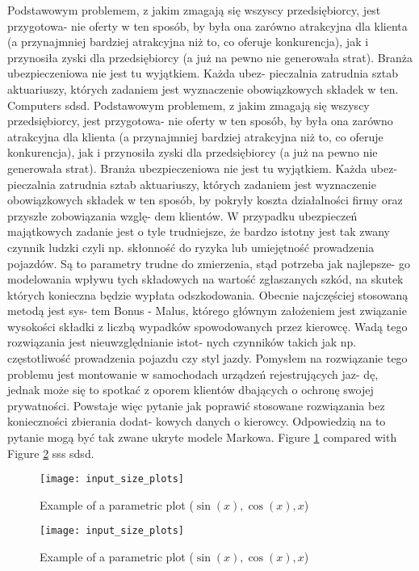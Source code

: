 \documentclass[a4paper, 11pt, onecolumn, openany, titlepage]{report}
\begin{document}
Podstawowym problemem, z jakim zmagają się wszyscy przedsiębiorcy, jest przygotowa- nie oferty w ten sposób, by była ona zarówno atrakcyjna dla klienta (a przynajmniej bardziej atrakcyjna niż to, co oferuje konkurencja), jak i przynosiła zyski dla przedsiębiorcy (a już na pewno nie generowała strat). Branża ubezpieczeniowa nie jest tu wyjątkiem. Każda ubez- pieczalnia zatrudnia sztab aktuariuszy, których zadaniem jest wyznaczenie obowiązkowych składek w ten.
Computers \cite{einstein} sdsd.
Podstawowym problemem, z jakim zmagają się wszyscy przedsiębiorcy, jest przygotowa- nie oferty w ten sposób, by była ona zarówno atrakcyjna dla klienta (a przynajmniej bardziej atrakcyjna niż to, co oferuje konkurencja), jak i przynosiła zyski dla przedsiębiorcy (a już na pewno nie generowała strat). Branża ubezpieczeniowa nie jest tu wyjątkiem. Każda ubez- pieczalnia zatrudnia sztab aktuariuszy, których zadaniem jest wyznaczenie obowiązkowych składek w ten sposób, by pokryły koszta działalności firmy oraz przyszłe zobowiązania wzglę- dem klientów. W przypadku ubezpieczeń majątkowych zadanie jest o tyle trudniejsze, że bardzo istotny jest tak zwany czynnik ludzki czyli np. skłonność do ryzyka lub umiejętność prowadzenia pojazdów. Są to parametry trudne do zmierzenia, stąd potrzeba jak najlepsze- go modelowania wpływu tych składowych na wartość zgłaszanych szkód, na skutek których konieczna będzie wypłata odszkodowania. Obecnie najczęściej stosowaną metodą jest sys- tem Bonus - Malus, którego głównym założeniem jest związanie wysokości składki z liczbą wypadków spowodowanych przez kierowcę. Wadą tego rozwiązania jest nieuwzględnianie istot- nych czynników takich jak np. częstotliwość prowadzenia pojazdu czy styl jazdy. Pomysłem na rozwiązanie tego problemu jest montowanie w samochodach urządzeń rejestrujących jaz- dę, jednak może się to spotkać z oporem klientów dbających o ochronę swojej prywatności. Powstaje więc pytanie jak poprawić stosowane rozwiązania bez konieczności zbierania dodat- kowych danych o kierowcy. Odpowiedzią na to pytanie mogą być tak zwane ukryte modele Markowa.
Figure \ref{fig:xxx} compared with Figure \ref{fig:yyy} sss \cite{einstein} sdsd.


\begin{figure}
\centering
\texttt{[image: input\_size\_plots]}
\caption{Example of a parametric plot ($\sin (x), \cos(x), x$)}
\label{fig:xxx}
\end{figure}
\begin{figure}
\centering
\texttt{[image: input\_size\_plots]}
\caption{Example of a parametric plot ($\sin (x), \cos(x), x$)}
\label{fig:yyy}
\end{figure}
\end{document}
